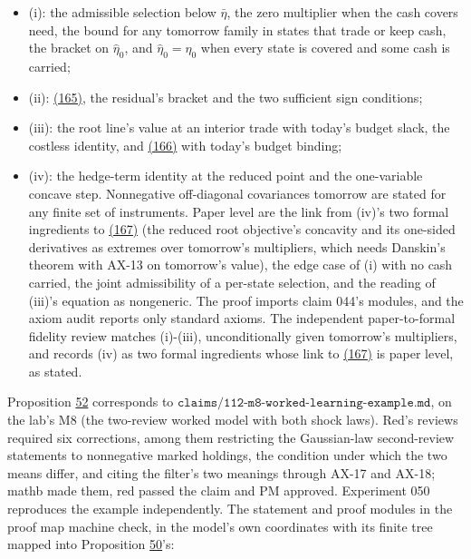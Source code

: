 \documentclass[11pt]{article}
\begin{document}
\begin{itemize}
  \item (i): the admissible selection below \(\bar\eta\), the zero multiplier when the
  cash covers \(\mathrm{need}\), the bound for any tomorrow family in states that
  trade or keep cash, the bracket on \(\hat\eta_0\), and \(\hat\eta_0=\eta_0\) when every state
  is covered and some cash is carried;
  \item (ii): \hyperref[eq:165]{(165)}, the residual's bracket and the two sufficient sign
  conditions;
  \item (iii): the root line's value at an interior trade with today's budget
  slack, the costless identity, and \hyperref[eq:166]{(166)} with today's budget binding;
  \item (iv): the hedge-term identity at the reduced point and the
  one-variable concave step.
Nonnegative off-diagonal covariances tomorrow are stated for any finite
set of instruments. Paper level are the link from (iv)'s two formal
ingredients to \hyperref[eq:167]{(167)} (the reduced root objective's concavity and its
one-sided derivatives as extremes over tomorrow's multipliers, which
needs Danskin's theorem with AX-13 on tomorrow's value), the edge case
of (i) with no cash carried, the joint admissibility of a per-state
selection, and the reading of (iii)'s equation as nongeneric. The proof
imports claim 044's modules, and the axiom audit reports only standard
axioms. The independent paper-to-formal fidelity review matches (i)-(iii),
unconditionally given tomorrow's multipliers, and records (iv) as two
formal ingredients whose link to \hyperref[eq:167]{(167)} is paper level, as stated.
\end{itemize}

Proposition \hyperref[res:Proposition-52]{52} corresponds to
\(\texttt{claims/112-m8-worked-learning-example.md}\), on the lab's M8 (the
two-review worked model with both shock laws). Red's reviews required
six corrections, among them restricting the Gaussian-law second-review
statements to nonnegative marked holdings, the condition under which
the two means differ, and citing the filter's two meanings through
AX-17 and AX-18; mathb made them, red passed the claim and PM approved.
Experiment 050 reproduces the example independently. The statement and
proof modules in the proof map machine check, in the model's own
coordinates with its finite tree mapped into Proposition \hyperref[res:Proposition-50]{50}'s:
\end{document}
